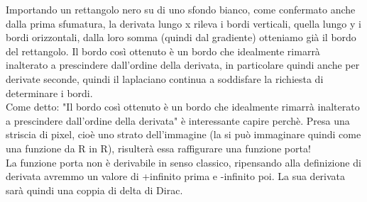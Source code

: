 Importando un rettangolo nero su di uno sfondo bianco, come confermato anche dalla prima sfumatura, la derivata lungo x rileva i bordi verticali, quella lungo y i bordi orizzontali, dalla loro somma (quindi dal gradiente) otteniamo già il bordo del rettangolo.
Il bordo così ottenuto è un bordo che idealmente rimarrà inalterato a prescindere dall'ordine della derivata, in particolare quindi anche per derivate seconde, quindi il laplaciano continua a soddisfare la richiesta di determinare i bordi. \\
Come detto: "Il bordo così ottenuto è un bordo che idealmente rimarrà inalterato a prescindere dall'ordine della derivata" è interessante capire perchè. Presa una striscia di pixel, cioè uno strato dell'immagine (la si può immaginare quindi come una funzione da R in R), risulterà essa raffigurare una funzione porta!\\
La funzione porta non è derivabile in senso classico, ripensando alla definizione di derivata avremmo un valore di +infinito prima e -infinito poi. La sua derivata sarà quindi una coppia di delta di Dirac.\\

